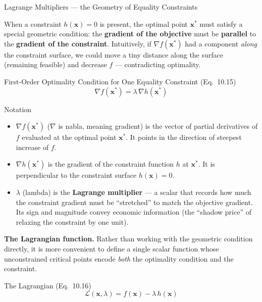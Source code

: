 \documentclass[aspectratio=169,10pt]{beamer}
\newcommand{\bx}{\mathbf{x}}
\newcommand{\Lagr}{\mathcal{L}}
\begin{document}
\begin{frame}[allowframebreaks]{Lagrange Multipliers --- the Geometry of Equality Constraints}

  When a constraint $h(\bx) = 0$ is present, the optimal point $\bx^*$ must
  satisfy a special geometric condition: the \textbf{gradient of the objective}
  must be \textbf{parallel} to the \textbf{gradient of the constraint}.
  Intuitively, if $\nabla f(\bx^*)$ had a component \emph{along} the
  constraint surface, we could move a tiny distance along the surface
  (remaining feasible) and decrease $f$ --- contradicting optimality.

  \begin{block}{First-Order Optimality Condition for One Equality Constraint (Eq.~10.15)}
    \[
      \nabla f(\bx^*) = \lambda\,\nabla h(\bx^*)
    \]
  \end{block}

  \begin{block}{Notation}
    \begin{itemize}
      \item $\nabla f(\bx^*)$ ($\nabla$ is nabla, meaning gradient) is the
            vector of partial derivatives of $f$ evaluated at the optimal point
            $\bx^*$.  It points in the direction of steepest increase of $f$.
      \item $\nabla h(\bx^*)$ is the gradient of the constraint function $h$
            at $\bx^*$.  It is perpendicular to the constraint surface
            $h(\bx) = 0$.
      \item $\lambda$ (lambda) is the \textbf{Lagrange multiplier} --- a scalar
            that records how much the constraint gradient must be ``stretched''
            to match the objective gradient.  Its sign and magnitude convey
            economic information (the ``shadow price'' of relaxing the
            constraint by one unit).
    \end{itemize}
  \end{block}

  \framebreak

  \textbf{The Lagrangian function.}  Rather than working with the geometric
  condition directly, it is more convenient to define a single scalar function
  whose unconstrained critical points encode \emph{both} the optimality
  condition and the constraint.

  \begin{block}{The Lagrangian (Eq.~10.16)}
    \[
      \Lagr(\bx, \lambda) = f(\bx) - \lambda\,h(\bx)
    \]
  \end{block}


\end{frame}
\end{document}
